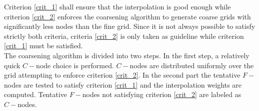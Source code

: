 {  
  Criterion \ref{crit_1} shall ensure that the interpolation is good enough
  while criterion \ref{crit_2} enforces the coarsening algorithm to generate
  coarse grids with significantly less nodes than the fine grid. Since it is
  not always possible to satisfy strictly both criteria, criteria \ref{crit_2}
  is only taken as guideline while criterion \ref{crit_1} must be satisfied.\\
  The coarsening algorithm is divided into two steps. In the first step, a
  relatively quick $C-$node choice is performed. $C-$nodes are distributed
  uniformly over the grid attempting to enforce criterion \ref{crit_2}. In the
  second part the tentative $F-$nodes are tested to satisfy criterion
  \ref{crit_1} and the interpolation weights are computed. Tentative $F-$nodes
  not satisfying criterion \ref{crit_2} are labeled as $C-$nodes.}



